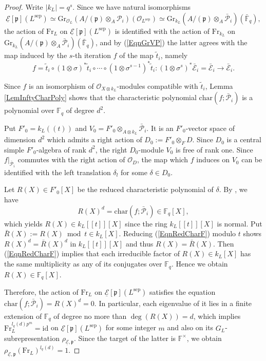 \documentclass[10pt]{amsart}
\theoremstyle{plain}
\theoremstyle{definition}
\newcommand{\chr}{\mathrm{char}}
\newcommand{\Fr}{\mathrm{Fr}}
\newcommand{\id}{\mathrm{id}}
\newcommand{\sep}{\mathrm{sep}}
\newcommand{\cE}{\mathcal{E}}
\newcommand{\cO}{\mathcal{O}}
\newcommand{\cP}{\mathcal{P}}
\newcommand{\Gr}{\mathrm{Gr}}
\newcommand{\ucE}{\underline{\mathcal{E}}}
\newcommand{\bF}{\mathbb{F}}
\newcommand{\frp}{\mathfrak{p}}
\begin{document}
\begin{proof}
	
	Write $|k_L|=q^s$. Since we have natural isomorphisms
	\[
	\ucE[\frp](L^\sep)\simeq \Gr_{\cO_{L}}(A/(\frp)\otimes_A \cP_i)(\cO_{L^\sep})\simeq \Gr_{k_L}(A/(\frp)\otimes_A \bar{\cP}_i)(\bar{\bF}_q),
	\]
	the action of $\Fr_L$ on $\ucE[\frp](L^\sep)$ is identified with the action of $\Fr_{k_L}$ on $\Gr_{k_L}(A/(\frp)\otimes_A \bar{\cP}_i)(\bar{\bF}_q)$,
	and by (\ref{EqnGrVP}) the latter agrees with the map induced by the $s$-th iteration $f$ of the map $\tilde{t}_i$, namely
	\[
	f=\tilde{t}_i\circ (1\otimes \sigma)^*\tilde{t}_i\circ \cdots\circ (1\otimes \sigma^{s-1})^*\tilde{t}_i: (1\otimes \sigma^{s})^*\bar{\cE}_i=\bar{\cE}_i\to 
	\bar{\cE}_i.
	\]
	
	Since $f$ is an isomorphism of $\cO_{X\otimes k_L}$-modules compatible with $\tilde{t}_i$, Lemma \ref{LemInftyCharPoly} shows that the characteristic 
	polynomial $
	\chr(f;\bar{\cP}_i)$ is a 
	polynomial 
	over $\bF_q$ of degree $d^2$. 
	
	Put $F'_0=k_L((t))$ and $V_0=F'_0\otimes_{A\otimes k_L} \bar{\cP}_i$. It is an $F'_0$-vector space of dimension $d^2$ which admits a right action of 
	$D_0:=F'_0\otimes_F D$. Since $D_0$ is a central simple $F'_0$-algebra of rank $d^2$, the right $D_0$-module $V_0$ is free of rank one.
	Since $f|_{\bar{\cP}_i}$ commutes with the right action of $\cO_D$, the map which $f$ induces on $V_0$ 
	can be identified with the left translation $\delta_l$ 
	for some 
	$\delta\in 
	D_0$.
	
	Let $R(X)\in F'_0[X]$ be the reduced characteristic polynomial of $\delta$. By \cite[Theorem 9.5]{Rei}, we have
	\begin{equation}\label{EqnRedCharF}
		R(X)^d=\chr(f;\bar{\cP}_i)\in \bF_q[X],
	\end{equation}
	which yields $R(X)\in k_L[[t]][X]$ since the ring $k_L[[t]][X]$ is normal. 
	Put $\bar{R}(X):=R(X)\bmod t\in k_L[X]$. Reducing (\ref{EqnRedCharF}) modulo $t$ shows $R(X)^d=\bar{R}(X)^d$ in $k_L[[t]][X]$ and thus $R(X)=\bar{R}(X)$.
	Then (\ref{EqnRedCharF}) implies that each irreducible factor of $R(X)\in k_L[X]$ has the same multiplicity as any of its conjugates over $\bF_q$.
	Hence we obtain $R(X)\in \bF_q[X]$.
	
	
	Therefore, the action of $\Fr_L$ on $\ucE[\frp](L^\sep)$ satisfies the equation $\chr(f;\bar{\cP}_i)=R(X)^d=0$. 
	In particular, each eigenvalue of it lies 
	in a finite extension of $\bF_q$ of degree no more than $\deg(R(X))=d$, which implies
	$\Fr_L^{l_q(d)p^{m}}=\id$ on $\ucE[\frp](L^\sep)$ for some integer $m$ 
	and also on its $G_{L}$-subrepresentation $\rho_{\ucE,\frp}$.
	Since the target of the latter is $\bF^\times$, we obtain $\rho_{\ucE,\frp}(\Fr_L)^{l_q(d)}=1$.
\end{proof}
\end{document}
